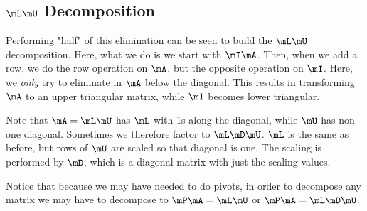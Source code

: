 \subsection{$\mL\mU$ Decomposition}

Performing "half" of this elimination can be seen to build the $\mL\mU$
decomposition. Here, what we do is we start with $\mI\mA$. Then, when we
add a row, we do the row operation on $\mA$, but the opposite operation
on $\mI$. Here, we \emph{only} try to eliminate in $\mA$ below the
diagonal. This results in transforming $\mA$ to an upper triangular
matrix, while $\mI$ becomes lower triangular.

Note that $\mA = \mL\mU$ has $\mL$ with 1s along the diagonal, while
$\mU$ has non-one diagonal. Sometimes we therefore factor to
$\mL\mD\mU$. $\mL$ is the same as before, but rows of $\mU$ are scaled
so that diagonal is one. The scaling is performed by $\mD$, which is a
diagonal matrix with just the scaling values.

Notice that because we may have needed to do pivots, in order to
decompose any matrix we may have to decompose to $\mP\mA = \mL\mU$ or
$\mP\mA=\mL\mD\mU$.
